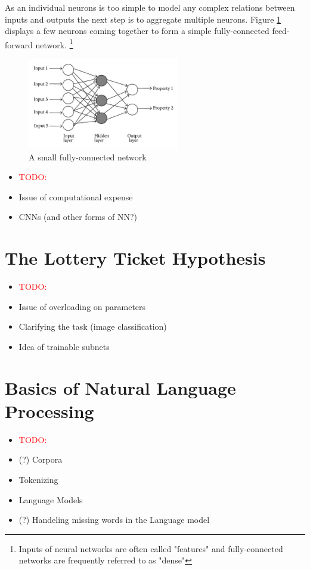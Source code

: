 As an individual neurons is too simple to model any complex relations between inputs
and outputs the next step is to aggregate multiple neurons. Figure \ref{fig:FFNetwork} displays a few neurons coming together to form a simple fully-connected feed-forward network.
\footnote{
	Inputs of neural networks are often called "features" and fully-connected networks are frequently referred to as "dense"	}
\begin{figure}
	\centering
		\includegraphics[height=150px]{gfx/Dense_FFNetwork.jpg}
		\caption{A small fully-connected network\\
			\cite{dense_network}}
		\label{fig:FFNetwork}
\end{figure}

\begin{itemize}
	\item \textcolor{red}{TODO:}
	\item Issue of computational expense
	\item CNNs (and other forms of NN?)
\end{itemize}
	
\section{The Lottery Ticket Hypothesis}
\begin{itemize}
	\item \textcolor{red}{TODO:}
	\item Issue of overloading on parameters
	\item Clarifying the task (image classification)
	\item Idea of trainable subnets
\end{itemize}

\section{Basics of Natural Language Processing}
\begin{itemize}
	\item \textcolor{red}{TODO:}
	\item (?) Corpora
	\item Tokenizing
	\item Language Models
	\item (?) Handeling missing words in the Language model
\end{itemize}

